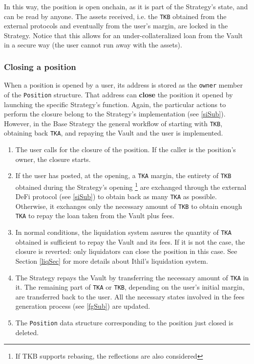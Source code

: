 \documentclass[a4paper,10 pt]{article}
\theoremstyle{definition}
\begin{document}
In this way, the position is open onchain, as it is part of the Strategy's state, and can be read by anyone. The assets received, i.e. the \verb|TKB| obtained from the external protocols and eventually from the user's margin, are locked in the Strategy. Notice that this allows for an under-collateralized loan from the Vault in a secure way (the user cannot run away with the assets). 

\subsubsection{Closing a position}\label{cpSubSub}

When a position is opened by a user, its address is stored as the \verb|owner| member of the \verb|Position| structure. That address can {\bf close} the position it opened by launching the specific Strategy's function. Again, the particular actions to perform the closure belong to the Strategy's implementation (see \ref{siSub}). However, in the Base Strategy the general workflow of starting with \verb|TKB|, obtaining back \verb|TKA|, and repaying the Vault and the user is implemented.

\begin{enumerate}
\item The user calls for the closure of the position. If the caller is the position's owner, the closure starts.
\item If the user has posted, at the opening, a \verb|TKA| margin, the entirety of \verb|TKB| obtained during the Strategy's opening \footnote{If TKB supports rebasing, the reflections are also considered} are exchanged through the external DeFi protocol (see \ref{siSub}) to obtain back as many \verb|TKA| as possible. Otherwise, it exchanges only the necessary amount of \verb|TKB| to obtain enough \verb|TKA| to repay the loan taken from the Vault plus fees.
\item In normal conditions, the liquidation system assures the quantity of \verb|TKA| obtained is sufficient to repay the Vault and its fees. If it is not the case, the closure is reverted: only liquidators can close the position in this case. See Section \ref{liqSec} for more details about Ithil's liquidation system.
\item The Strategy repays the Vault by transferring the necessary amount of \verb|TKA| in it. The remaining part of \verb|TKA| or \verb|TKB|, depending on the user's initial margin, are transferred back to the user. All the necessary states involved in the fees generation process (see \ref{fgSub}) are updated.
\item The \verb|Position| data structure corresponding to the position just closed is deleted.
\end{enumerate}
\end{document}
